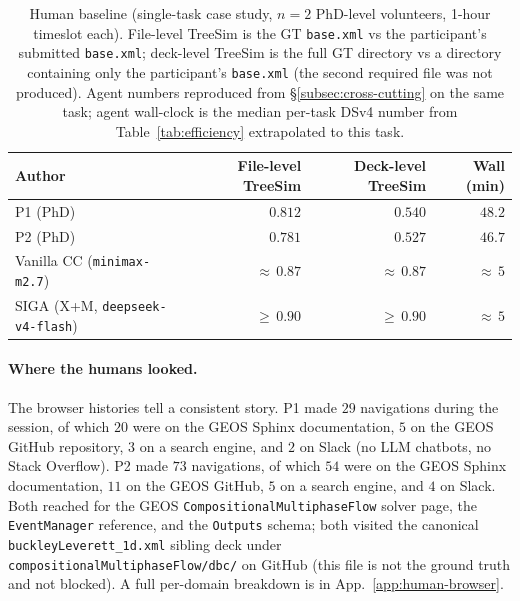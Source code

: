 \documentclass{article}
\begin{document}
\begin{table}[h]
  \caption{Human baseline (single-task case study, $n=2$ PhD-level volunteers, 1-hour timeslot each). File-level TreeSim is the GT \texttt{base.xml} vs the participant's submitted \texttt{base.xml}; deck-level TreeSim is the full GT directory vs a directory containing only the participant's \texttt{base.xml} (the second required file was not produced). Agent numbers reproduced from \S\ref{subsec:cross-cutting} on the same task; agent wall-clock is the median per-task DSv4 number from Table~\ref{tab:efficiency} extrapolated to this task.}
  \label{tab:human-baseline}
  \centering
  \small
  \begin{tabular}{lrrr}
    \toprule
    \textbf{Author} & \textbf{File-level TreeSim} & \textbf{Deck-level TreeSim} & \textbf{Wall (min)} \\
    \midrule
    P1 (PhD)                            & $0.812$         & $0.540$         & $48.2$ \\
    P2 (PhD)                            & $0.781$         & $0.527$         & $46.7$ \\
    Vanilla CC (\texttt{minimax-m2.7})  & ${\approx}\,0.87$ & ${\approx}\,0.87$ & ${\approx}\,5$ \\
    SIGA (X+M, \texttt{deepseek-v4-flash}) & ${\geq}\,0.90$  & ${\geq}\,0.90$  & ${\approx}\,5$ \\
    \bottomrule
  \end{tabular}
\end{table}

\paragraph{Where the humans looked.} The browser histories tell a consistent story. P1 made $29$ navigations during the session, of which $20$ were on the GEOS Sphinx documentation, $5$ on the GEOS GitHub repository, $3$ on a search engine, and $2$ on Slack (no LLM chatbots, no Stack Overflow). P2 made $73$ navigations, of which $54$ were on the GEOS Sphinx documentation, $11$ on the GEOS GitHub, $5$ on a search engine, and $4$ on Slack. Both reached for the GEOS \texttt{CompositionalMultiphaseFlow} solver page, the \texttt{EventManager} reference, and the \texttt{Outputs} schema; both visited the canonical \texttt{buckleyLeverett\_1d.xml} sibling deck under \texttt{compositionalMultiphaseFlow/dbc/} on GitHub (this file is not the ground truth and not blocked). A full per-domain breakdown is in App.~\ref{app:human-browser}.
\end{document}
